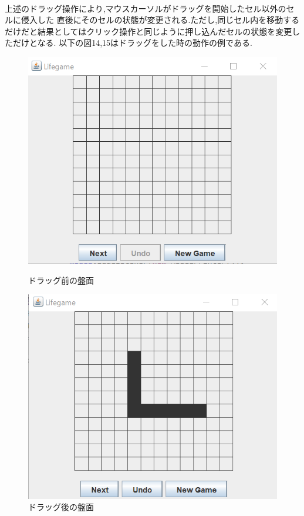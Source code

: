 \documentclass[dvipdfmx]{jarticle}
\begin{document}
  \\上述のドラッグ操作により,マウスカーソルがドラッグを開始したセル以外のセルに侵入した
  直後にそのセルの状態が変更される.ただし,同じセル内を移動するだけだと結果としてはクリック操作と同じように押し込んだセルの状態を変更しただけとなる.
  以下の図14,15はドラッグをした時の動作の例である.
  \begin{figure}[htbp]
    \begin{minipage}[b]{0.45\linewidth}
      \centering
      \includegraphics[keepaspectratio, scale=0.4]{panel_normal.png}
      \caption{ドラッグ前の盤面}
    \end{minipage}
    \begin{minipage}[b]{0.45\linewidth}
      \centering
      \includegraphics[keepaspectratio, scale=0.4]{panel_drag.png}
      \caption{ドラッグ後の盤面}
    \end{minipage}
\end{figure}
\end{document}
